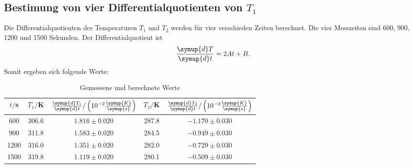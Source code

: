 \subsection{Bestimung von vier Differentialquotienten von $T_1$}
Die Differentialquotienten der Temperaturen $T_1$ und $T_2$ werden für vier verschieden
Zeiten berechnet. Die vier Messzeiten sind 600, 900, 1200 und 1500 Sekunden. Der
Differentialquotient ist
\begin{equation}
  \frac{\symup{d}T}{\symup{d}t} = 2At + B .
\end{equation}
Somit ergeben sich folgende Werte:
\begin{table}
  \centering
  \caption{Gemessene und berechnete Werte}
  \label{tab:Parameter}
  \begin{tabular}{c c c c c}
    \toprule
    $t/$s & $T_1/$K & $\frac{\symup{d}T_1}{\symup{d}t}/\left(10^{-2}\frac{\symup{K}}{\symup{s}}\right)$ & $T_2/$K & $\frac{\symup{d}T_2}{\symup{d}t}/\left(10^{-2}\frac{\symup{K}}{\symup{s}}\right)$  \\
    \midrule
      600 &  306.6 & $1.816 \pm 0.020$ & 287.8 & $-1.170  \pm 0.030$ \\
      900 &  311.8 & $1.583 \pm 0.020$ & 284.5 & $-0.949  \pm 0.030$ \\
      1200 & 316.0 & $1.351 \pm 0.020$ & 282.0 & $-0.729 \pm 0.030$ \\
      1500 & 319.8 & $1.119 \pm 0.020$ & 280.1 & $-0.509 \pm 0.030$ \\
   \bottomrule
 \end{tabular}
\end{table}

